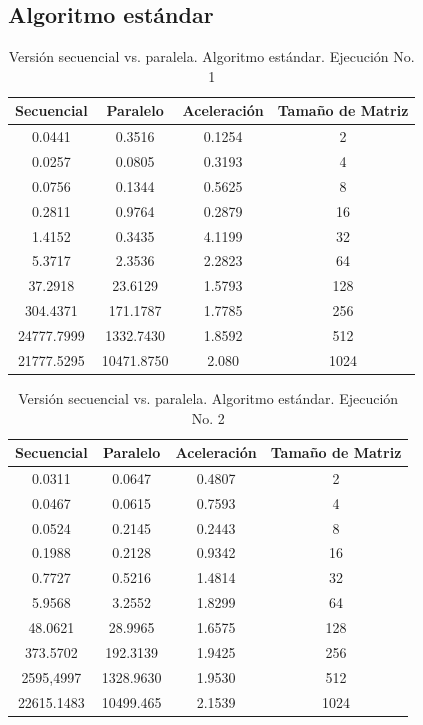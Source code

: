 \documentclass{article}
\begin{document}
\subsection{Algoritmo estándar}

\begin{table}[ht]
\centering
\begin{tabular}{|c|c|c|c|}
\hline
\textbf{Secuencial} & \textbf{Paralelo} & \textbf{Aceleración} & \textbf{Tamaño de Matriz} \\
\hline
0.0441 & 0.3516 & 0.1254 & 2 \\
0.0257 & 0.0805 & 0.3193 & 4 \\
0.0756 & 0.1344 & 0.5625 & 8 \\
0.2811 & 0.9764 & 0.2879 & 16 \\
1.4152 & 0.3435 & 4.1199 & 32 \\
5.3717 & 2.3536 & 2.2823 & 64 \\
37.2918 & 23.6129 & 1.5793 & 128 \\
304.4371 & 171.1787 & 1.7785 & 256 \\
24777.7999 & 1332.7430 & 1.8592 & 512 \\
21777.5295 & 10471.8750 & 2.080 & 1024 \\
\hline
\end{tabular}
\caption{Versión secuencial vs. paralela. Algoritmo estándar. Ejecución No. 1}
\end{table}

\begin{table}[ht]
\centering
\begin{tabular}{|c|c|c|c|}
\hline
\textbf{Secuencial} & \textbf{Paralelo} & \textbf{Aceleración} & \textbf{Tamaño de Matriz} \\
\hline
0.0311 & 0.0647 & 0.4807 & 2 \\
0.0467 & 0.0615 & 0.7593 & 4 \\
0.0524 & 0.2145 & 0.2443 & 8 \\
0.1988 & 0.2128 & 0.9342 & 16 \\
0.7727 & 0.5216 & 1.4814 & 32 \\
5.9568 & 3.2552 & 1.8299 & 64 \\
48.0621 & 28.9965 & 1.6575 & 128 \\
373.5702 & 192.3139 & 1.9425 & 256 \\
2595,4997 & 1328.9630 & 1.9530 & 512 \\
22615.1483 & 10499.465 & 2.1539 & 1024 \\
\hline
\end{tabular}
\caption{Versión secuencial vs. paralela. Algoritmo estándar. Ejecución No. 2}
\end{table}
\end{document}
